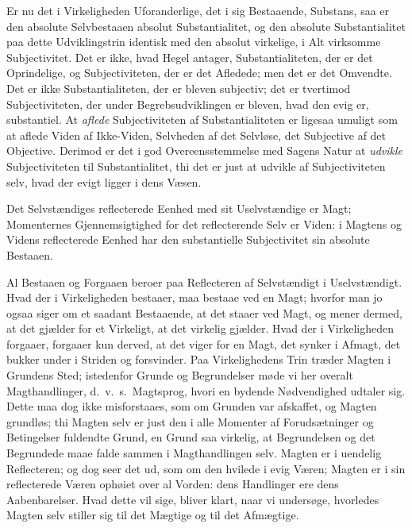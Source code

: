 \documentclass[12pt]{book}
\newcommand{\opage}[1]{\marginnote{\footnotesize\textit{[#1]}}}
\begin{document}
Er nu det i Virkeligheden Uforanderlige, det i sig Bestaaende, Substans, saa er den
absolute Selvbestaaen absolut Substantialitet, og den absolute Substantialitet paa
dette Udviklingstrin identisk med den absolut virkelige, i Alt virksomme Subjectivitet.
Det er ikke, hvad Hegel antager, Substantialiteten, der er det Oprindelige, og
Subjectiviteten, der er det Afledede; men det er det Omvendte. Det er ikke
Substantialiteten, der er bleven subjectiv; det er tvertimod Subjectiviteten, der
under Begrebsudviklingen er bleven, hvad den evig er, substantiel. At \emph{aflede}
Subjectiviteten af Substantialiteten er ligesaa umuligt som at aflede Viden af
Ikke-Viden, Selvheden af det Selvløse, det Subjective af det Objective. Derimod er det
i god Overeensstemmelse med Sagens Natur at \emph{udvikle} Subjectiviteten til
Substantialitet, thi det er just at udvikle af Subjectiviteten selv, hvad der evigt
ligger i dens Væsen.

Det Selvstændiges reflecterede Eenhed med sit Uselvstændige er Magt; Momenternes
Gjennemsigtighed for det reflecterende Selv er Viden: i Magtens og Videns reflecterede
Eenhed har den substantielle Subjectivitet sin absolute Bestaaen.

Al Bestaaen og Forgaaen beroer paa Reflecteren af Selvstændigt i Uselvstændigt. Hvad
der i Virkeligheden bestaaer, maa bestaae ved en Magt; hvorfor man jo ogsaa siger om et
saadant Bestaaende, at det staaer ved Magt, og mener dermed, at det gjælder for et
Virkeligt, at det virkelig gjælder. Hvad der i Virkeligheden forgaaer, forgaaer kun
derved, at det viger for en Magt, det synker i Afmagt, det bukker under i Striden og
forsvinder. Paa Virkelighedens Trin træder Magten i Grundens Sted; istedenfor Grunde
og Begrundelser møde vi her overalt Magthandlinger, d.\ v.\ s.\ Magtsprog,
\opage{111} hvori en bydende Nødvendighed udtaler sig. Dette maa dog ikke misforstaaes, som om
Grunden var afskaffet, og Magten grundløs; thi Magten selv er just den i alle Momenter
af Forudsætninger og Betingelser fuldendte Grund, en Grund saa virkelig, at
Begrundelsen og det Begrundede maae falde sammen i Magthandlingen selv. Magten er i
uendelig Reflecteren; og dog seer det ud, som om den hvilede i evig Væren; Magten er i
sin reflecterede Væren ophøiet over al Vorden: dens Handlinger ere dens Aabenbarelser.
Hvad dette vil sige, bliver klart, naar vi undersøge, hvorledes Magten selv stiller
sig til det Mægtige og til det Afmægtige.
\end{document}
